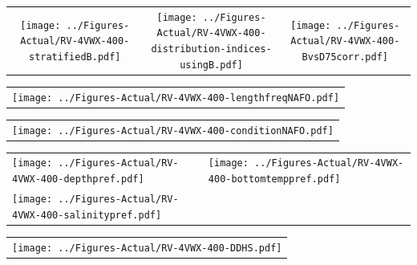 \documentclass[12pt]{article}\usepackage[]{graphicx}\usepackage[]{color}
\begin{document}
\vspace{1cm}
\begin{minipage}{1.0\textwidth}
 \begin{tabular}{ccc}
\texttt{[image: ../Figures-Actual/RV-4VWX-400-stratifiedB.pdf]} & 
\texttt{[image: ../Figures-Actual/RV-4VWX-400-distribution-indices-usingB.pdf]} & 
\texttt{[image: ../Figures-Actual/RV-4VWX-400-BvsD75corr.pdf]} \\ 
\end{tabular} 
\end{minipage}
\clearpage
\begin{minipage}{1.0\textwidth}
 \begin{tabular}{c}
\texttt{[image: ../Figures-Actual/RV-4VWX-400-lengthfreqNAFO.pdf]} \\ 
\end{tabular} 
\end{minipage}
\newline

\vspace{1cm}
\begin{minipage}{1.0\textwidth}
 \begin{tabular}{c}
\texttt{[image: ../Figures-Actual/RV-4VWX-400-conditionNAFO.pdf]} \\ 
\end{tabular} 
\end{minipage}
\clearpage
\begin{minipage}{1.0\textwidth}
 \begin{tabular}[t]{m{3in}m{3in}}
\texttt{[image: ../Figures-Actual/RV-4VWX-400-depthpref.pdf]} & 
\texttt{[image: ../Figures-Actual/RV-4VWX-400-bottomtemppref.pdf]} \\ 
\texttt{[image: ../Figures-Actual/RV-4VWX-400-salinitypref.pdf]} & 
 \\ 
\end{tabular} 
\end{minipage}
\newline

\vspace{1cm}
\begin{minipage}{1.0\textwidth}
 \begin{tabular}{c}
\texttt{[image: ../Figures-Actual/RV-4VWX-400-DDHS.pdf]} \\ 
\end{tabular} 
\end{minipage}
\clearpage
\end{document}
